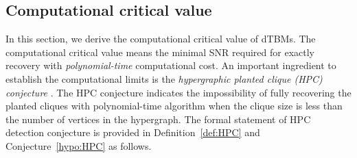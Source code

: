 \documentclass[lettersize,onecolumn,journal]{IEEEtran}
\theoremstyle{definition}
\newtheorem{thm}{Theorem}
\theoremstyle{definition}
\newcommand{\of}[1]{\left(#1\right)}
\begin{document}












\subsection{Computational critical value}\label{sec:complimit}
In this section, we derive the computational critical value of dTBMs. The computational critical value means the minimal SNR required for exactly recovery with \emph{polynomial-time} computational cost. An important ingredient to establish the computational limits is the \emph{hypergraphic planted clique (HPC) conjecture} \citep{zhang2018tensor, brennan2020reducibility}. The HPC conjecture indicates the impossibility of fully recovering the planted cliques with polynomial-time algorithm when the clique size is less than the number of vertices in the hypergraph. The formal statement of HPC detection conjecture is provided in Definition~\ref{def:HPC} and Conjecture~\ref{hypo:HPC} as follows.  
\end{document}
